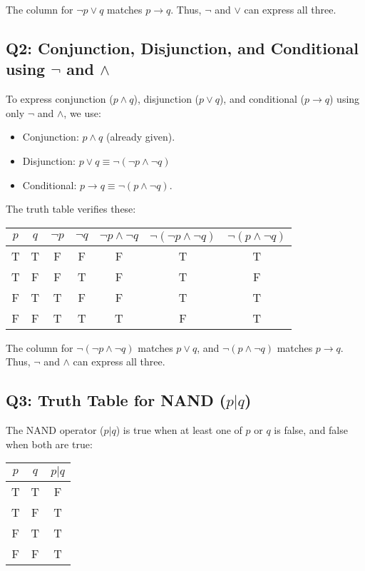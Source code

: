\documentclass[12pt]{article}
\begin{document}
The column for $\neg p \vee q$ matches $p \to q$. Thus, $\neg$ and $\vee$ can express all three.

\subsection*{Q2: Conjunction, Disjunction, and Conditional using $\neg$ and $\wedge$}
To express conjunction ($p \wedge q$), disjunction ($p \vee q$), and conditional ($p \to q$) using only $\neg$ and $\wedge$, we use:
\begin{itemize}
    \item Conjunction: $p \wedge q$ (already given).
    \item Disjunction: $p \vee q \equiv \neg(\neg p \wedge \neg q)$
    \item Conditional: $p \to q \equiv \neg(p \wedge \neg q)$.
\end{itemize}
The truth table verifies these:

\begin{center}
\begin{tabular}{cc|ccccc}
\toprule
$p$ & $q$ & $\neg p$ & $\neg q$ & $\neg p \wedge \neg q$ & $\neg(\neg p \wedge \neg q)$ & $\neg(p \wedge \neg q)$ \\
\midrule
T & T & F & F & F & T & T \\
T & F & F & T & F & T & F \\
F & T & T & F & F & T & T \\
F & F & T & T & T & F & T \\
\bottomrule
\end{tabular}
\end{center}

The column for $\neg(\neg p \wedge \neg q)$ matches $p \vee q$, and $\neg(p \wedge \neg q)$ matches $p \to q$. Thus, $\neg$ and $\wedge$ can express all three.

\subsection*{Q3: Truth Table for NAND ($p | q$)}
The NAND operator ($p | q$) is true when at least one of $p$ or $q$ is false, and false when both are true:

\begin{center}
\begin{tabular}{cc|c}
\toprule
$p$ & $q$ & $p | q$ \\
\midrule
T & T & F \\
T & F & T \\
F & T & T \\
F & F & T \\
\bottomrule
\end{tabular}
\end{center}
\end{document}
